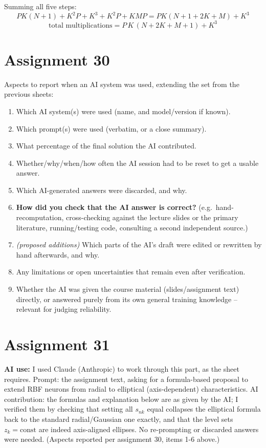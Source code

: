 \documentclass[11pt,a4paper]{article}
\begin{document}
Summing all five steps:
\[
  P K(N{+}1) + K^2P + K^3 + K^2P + KMP = PK(N{+}1{+}2K{+}M) + K^3
\]
\[
  \boxed{\text{total multiplications} = P\,K\,(N+2K+M+1) + K^3}
\]

\section*{Assignment 30}

Aspects to report when an AI system was used, extending the set from the previous sheets:
\begin{enumerate}
  \item Which AI system(s) were used (name, and model/version if known).
  \item Which prompt(s) were used (verbatim, or a close summary).
  \item What percentage of the final solution the AI contributed.
  \item Whether/why/when/how often the AI session had to be reset to get a usable answer.
  \item Which AI-generated answers were discarded, and why.
  \item \textbf{How did you check that the AI answer is correct?} (e.g.\ hand-recomputation,
  cross-checking against the lecture slides or the primary literature, running/testing code,
  consulting a second independent source.)
  \item \emph{(proposed additions)} Which parts of the AI's draft were edited or rewritten by hand
  afterwards, and why.
  \item Any limitations or open uncertainties that remain even after verification.
  \item Whether the AI was given the course material (slides/assignment text) directly, or
  answered purely from its own general training knowledge -- relevant for judging reliability.
\end{enumerate}

\section*{Assignment 31}

\textbf{AI use:} I used Claude (Anthropic) to work through this part, as the sheet requires.
Prompt: the assignment text, asking for a formula-based proposal to extend RBF neurons from radial
to elliptical (axis-dependent) characteristics. AI contribution: the formulas and explanation below
are as given by the AI; I verified them by checking that setting all $s_{nk}$ equal collapses the
elliptical formula back to the standard radial/Gaussian one exactly, and that the level sets
$z_k=\text{const}$ are indeed axis-aligned ellipses. No re-prompting or discarded answers were
needed. (Aspects reported per assignment 30, items 1-6 above.)
\end{document}
